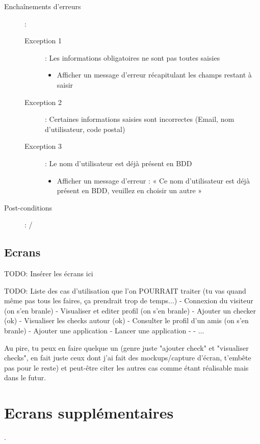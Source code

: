 \documentclass[a4paper,12pt]{report}
\begin{document}
\begin{onehalfspace}
\begin{description}
  \item[Enchaînements d’erreurs]:
  \begin{description}
    \item[Exception 1]: Les informations obligatoires ne sont pas toutes saisies
    \begin{itemize}
      \item Afficher un message d’erreur récapitulant les champs restant à saisir
    \end{itemize}
    \item[Exception 2]: Certaines informations saisies sont incorrectes (Email, nom d’utilisateur, code postal)
    \item[Exception 3]: Le nom d’utilisateur est déjà présent en BDD
    \begin{itemize}
      \item Afficher un message d’erreur : « Ce nom d’utilisateur est déjà présent en BDD, veuillez en choisir un autre »
    \end{itemize}
  \end{description}

  \item[Post-conditions]: /
\end{description}

\section{Ecrans} %
\label{sec:ecrans}
TODO: Insérer les écrans ici

TODO: Liste des cas d'utilisation que l'on POURRAIT traiter (tu vas quand même pas tous les faires, ça prendrait trop de temps...)
- Connexion du visiteur (on s'en branle)
- Visualiser et editer profil (on s'en branle)
- Ajouter un checker (ok)
- Visualiser les checks autour (ok)
- Consulter le profil d'un amis (on s'en branle)
- Ajouter une application
- Lancer une application
-
- ...

Au pire, tu peux en faire quelque un (genre juste "ajouter check" et "visualiser checks", en fait juste ceux dont j'ai fait des mockups/capture d'écran, t'embête pas pour le reste) et peut-être citer les autres cas comme étant réalisable mais dans le futur.

\chapter{Ecrans supplémentaires} %
\label{cha:ecrans_suppl_mentaires}
.


\end{onehalfspace}
\end{document}
